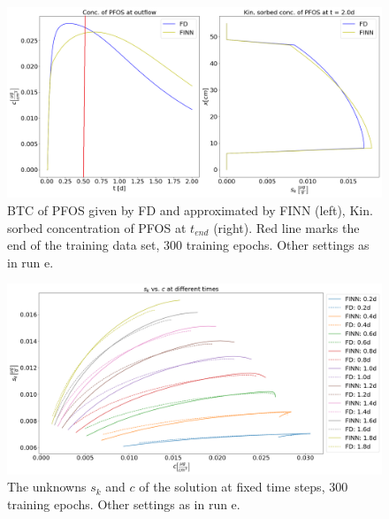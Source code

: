 \begin{figure}
	\centering
	\includegraphics[scale=0.3]{images/res_btc_synt_FGR_300_m.png}
\caption[Additional comparison of FINN and FD BTCs]{BTC of PFOS given by FD and approximated by FINN (left), Kin. sorbed concentration of PFOS at $t_{end}$ (right). Red line marks the end of the training data set, 300 training epochs. Other settings as in run e.}
\label{fig:res_btc_synt_FGR_300_m}
\end{figure}
\begin{figure}
	\centering
	\includegraphics[scale=0.3]{images/res_sorp_synt_FGR_300.png}
\caption[Additional comparison of FINN and FD sorption behavior]{The unknowns $s_k$ and $c$ of the solution at fixed time steps, 300 training epochs. Other settings as in run e.}
\label{fig:res_sorp_synt_FGR_300}
\end{figure}
